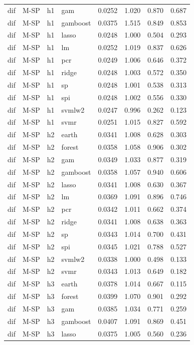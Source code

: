 \begin{ThreePartTable}
\begin{longtable}[t]{llclcccc}
dif & M-SP & h1 & gam & 0.0252 & 1.020 & 0.870 & 0.687\\
dif & M-SP & h1 & gamboost & 0.0375 & 1.515 & 0.849 & 0.853\\
dif & M-SP & h1 & lasso & 0.0248 & 1.000 & 0.504 & 0.293\\
dif & M-SP & h1 & lm & 0.0252 & 1.019 & 0.837 & 0.626\\
dif & M-SP & h1 & pcr & 0.0249 & 1.006 & 0.646 & 0.372\\
dif & M-SP & h1 & ridge & 0.0248 & 1.003 & 0.572 & 0.350\\
dif & M-SP & h1 & sp & 0.0248 & 1.001 & 0.538 & 0.313\\
dif & M-SP & h1 & spi & 0.0248 & 1.002 & 0.556 & 0.330\\
dif & M-SP & h1 & svmlw2 & 0.0247 & 0.996 & 0.262 & 0.123\\
dif & M-SP & h1 & svmr & 0.0251 & 1.015 & 0.827 & 0.592\\
\addlinespace
dif & M-SP & h2 & earth & 0.0341 & 1.008 & 0.628 & 0.303\\
dif & M-SP & h2 & forest & 0.0358 & 1.058 & 0.906 & 0.302\\
dif & M-SP & h2 & gam & 0.0349 & 1.033 & 0.877 & 0.319\\
dif & M-SP & h2 & gamboost & 0.0358 & 1.057 & 0.940 & 0.606\\
dif & M-SP & h2 & lasso & 0.0341 & 1.008 & 0.630 & 0.367\\
dif & M-SP & h2 & lm & 0.0369 & 1.091 & 0.896 & 0.746\\
dif & M-SP & h2 & pcr & 0.0342 & 1.011 & 0.662 & 0.374\\
dif & M-SP & h2 & ridge & 0.0341 & 1.008 & 0.638 & 0.363\\
dif & M-SP & h2 & sp & 0.0343 & 1.014 & 0.700 & 0.431\\
dif & M-SP & h2 & spi & 0.0345 & 1.021 & 0.788 & 0.527\\
dif & M-SP & h2 & svmlw2 & 0.0338 & 1.000 & 0.498 & 0.133\\
dif & M-SP & h2 & svmr & 0.0343 & 1.013 & 0.649 & 0.182\\
\addlinespace
dif & M-SP & h3 & earth & 0.0378 & 1.014 & 0.667 & 0.115\\
dif & M-SP & h3 & forest & 0.0399 & 1.070 & 0.901 & 0.292\\
dif & M-SP & h3 & gam & 0.0385 & 1.034 & 0.771 & 0.259\\
dif & M-SP & h3 & gamboost & 0.0407 & 1.091 & 0.869 & 0.451\\
dif & M-SP & h3 & lasso & 0.0375 & 1.005 & 0.560 & 0.236\\

\end{longtable}
\end{ThreePartTable}
